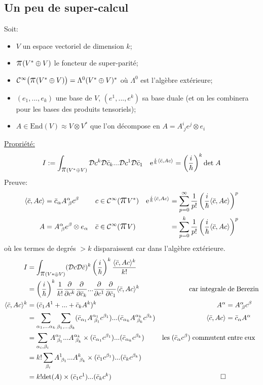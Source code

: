 \documentclass[a4paper,11pt]{article}
\newcommand{\D}{{\mathcal{D}}}
\newcommand{\e}{{\mathrm{e}}}
\newcommand{\dr}[2]{\frac{\partial {#1}}{\partial{#2}}}
\newcommand{\ppi}{{\mathlarger{\mathlarger{\mathlarger{\pi}}}}}
\begin{document}
\subsection{Un peu de super-calcul}
Soit:
\begin{itemize}
\item $V$ un espace vectoriel de dimension $k$;
\item $\ppi(V^*\oplus V)$ le foncteur de super-parité;
\item $\mathcal{C}^\infty\big(\ppi(V^*\oplus V)\big) = \Lambda^0(V^*\oplus V)^*$ où $\Lambda^0$ est l'algèbre extérieure;
\item $(e_1, ..., e_k)$ une base de $V$, $(e^1, ..., e^k)$ sa base duale (et on les combinera pour les bases des produits tensoriels);
\item $A\in \mathrm{End}(V)\approx V\otimes V^*$ que l'on décompose en $A=A^i_{\;j}e^j\otimes e_i$
\end{itemize}
\underline{Propriété:}
$$
I:= \int_{\ppi(V^*\oplus V)}\D c^k \D \Bar c_k ... \D c^1 \D \Bar c_1 \quad \e^{\frac i \hbar \langle \Bar c, A c \rangle}
= \left(\frac{i}{\hbar}\right)^k \mathrm{det} \; A
$$
Preuve:
\begin{align*}
\langle \bar c, A c \rangle &= \bar c_\alpha A^\alpha_{\;\beta} c^\beta &
c &\in \mathcal{C}^\infty(\ppi V^*) &
\e^{\frac i \hbar \langle\bar c, A c\rangle} &= \sum_{p=0}^\infty \frac{1}{p!}\left(\frac{i}{\hbar}\langle\bar c, Ac\rangle\right)^p\\
A &= A^\alpha_{\;\beta} e^\beta\otimes e_\alpha&
\bar c &\in \mathcal{C}^\infty(\ppi V)&
&=\sum_{p=0}^k \frac{1}{p!}\left(\frac{i}{\hbar}\langle\bar c, Ac\rangle\right)^p
\end{align*}
où les termes de degrés $>k$ disparaissent car dans l'algèbre extérieure.
\begin{align*}
I &= \int_{\ppi(V*\oplus V)} (\D c\D \bar c)^k \left(\frac i \hbar \right)^k \frac{\langle\bar c,Ac\rangle^k}{k!}&&\\
&= \left( \frac i \hbar \right)^k \frac 1 {k!} \dr{}{c^k}\dr{}{\bar c_k}...\dr{}{c^1}\dr{}{\bar c_1} \langle\bar c, Ac\rangle^k &
\mathrm{car}\;\mathrm{integrale} & \; \mathrm{de}\;\mathrm{Berezin}\\
\langle\bar c, Ac\rangle^k &= (\bar c_1 A^1+ ... + \bar c_k A^k)^k & A^\alpha &= A^\alpha_{\;\beta} c^\beta\\
&= \sum_{\alpha_1, ... \alpha_k} \sum_{\beta_1, ...\beta_k} (\bar c_{\alpha_1} A^{\alpha_1}_{\;\beta_1}c^{\beta_1})...(\bar c_{\alpha_k} A^{\alpha_k}_{\;\beta_k}c^{\beta_k})&
\langle\bar c, Ac\rangle &= \bar c_\alpha A^\alpha\\
&= \sum_{\alpha_i, \beta_i} A^{\alpha_1}_{\;\beta_1}...A^{\alpha_k}_{\;\beta_k} \times (\bar c_{\alpha_1} c^{\beta_1})...(\bar c_{\alpha_k} c^{\beta_k})
& \mathrm{les}\; (\bar c_\alpha c^\beta)\;\mathrm{commutent}&\;\mathrm{entre}\;\mathrm{eux}\\
&= k! \sum_{\beta_i} A^{1}_{\;\beta_1}...A^{k}_{\;\beta_k} \times (\bar c_{1} c^{\beta_1})...(\bar c_{k} c^{\beta_k})\\
&= k! \mathrm{det}(A)\times (\bar c_{1} c^{1})...(\bar c_{k} c^{k})& \Box
\end{align*}
\end{document}
